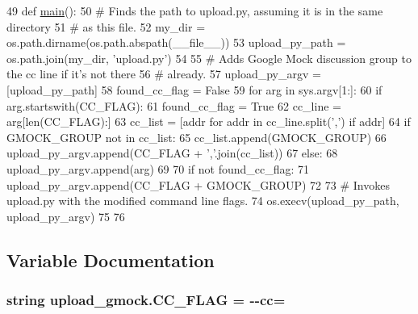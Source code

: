 \begin{DoxyCode}
49 \textcolor{keyword}{def }\hyperlink{namespacerelease__docs_ac4eb92814ebe701e3936d1bfdd2ecf73}{main}():
50   \textcolor{comment}{# Finds the path to upload.py, assuming it is in the same directory}
51   \textcolor{comment}{# as this file.}
52   my\_dir = os.path.dirname(os.path.abspath(\_\_file\_\_))
53   upload\_py\_path = os.path.join(my\_dir, \textcolor{stringliteral}{'upload.py'})
54 
55   \textcolor{comment}{# Adds Google Mock discussion group to the cc line if it's not there}
56   \textcolor{comment}{# already.}
57   upload\_py\_argv = [upload\_py\_path]
58   found\_cc\_flag = \textcolor{keyword}{False}
59   \textcolor{keywordflow}{for} arg \textcolor{keywordflow}{in} sys.argv[1:]:
60     \textcolor{keywordflow}{if} arg.startswith(CC\_FLAG):
61       found\_cc\_flag = \textcolor{keyword}{True}
62       cc\_line = arg[len(CC\_FLAG):]
63       cc\_list = [addr \textcolor{keywordflow}{for} addr \textcolor{keywordflow}{in} cc\_line.split(\textcolor{stringliteral}{','}) \textcolor{keywordflow}{if} addr]
64       \textcolor{keywordflow}{if} GMOCK\_GROUP \textcolor{keywordflow}{not} \textcolor{keywordflow}{in} cc\_list:
65         cc\_list.append(GMOCK\_GROUP)
66       upload\_py\_argv.append(CC\_FLAG + \textcolor{stringliteral}{','}.join(cc\_list))
67     \textcolor{keywordflow}{else}:
68       upload\_py\_argv.append(arg)
69 
70   \textcolor{keywordflow}{if} \textcolor{keywordflow}{not} found\_cc\_flag:
71     upload\_py\_argv.append(CC\_FLAG + GMOCK\_GROUP)
72 
73   \textcolor{comment}{# Invokes upload.py with the modified command line flags.}
74   os.execv(upload\_py\_path, upload\_py\_argv)
75 
76 
\end{DoxyCode}


\subsection{Variable Documentation}
\subsubsection[{\texorpdfstring{C\+C\+\_\+\+F\+L\+AG}{CC_FLAG}}]{\setlength{\rightskip}{0pt plus 5cm}string upload\+\_\+gmock.\+C\+C\+\_\+\+F\+L\+AG = \textquotesingle{}-\/-\/{\bf cc}=\textquotesingle{}}\hypertarget{namespaceupload__gmock_a463de67b37725c16ba31c5d4702e15b8}{}\label{namespaceupload__gmock_a463de67b37725c16ba31c5d4702e15b8}
